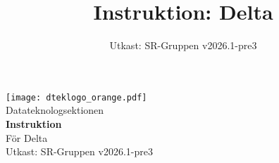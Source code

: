 \documentclass[a4paper]{dtek}
\title{Instruktion: Delta}
\date{Utkast: SR-Gruppen v2026.1-pre3}
\begin{document}
\begin{titlepage}
  \thispagestyle{empty} %
  \vspace*{\fill}
  \begin{center}
    \texttt{[image: dteklogo\_orange.pdf]}\\[3em]
    {\Huge Datateknologsektionen}\\[3em]
    {\Huge \textbf{Instruktion}}\\[1em]
    {\Huge För Delta}\\[3em]
    Utkast: SR-Gruppen v2026.1-pre3\\[20em]
  \end{center}
  \vspace*{\fill}
\end{titlepage}

\makeheadfoot

\setcounter{tocdepth}{2}
\tableofcontents
\end{document}
